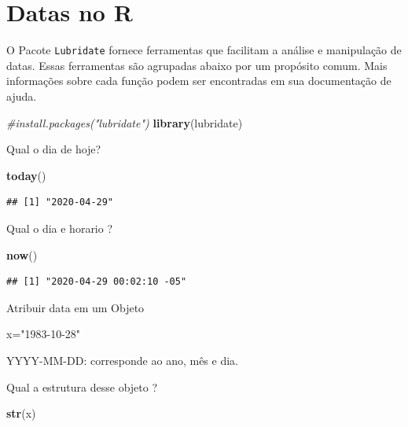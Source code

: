 \documentclass[
]{book}
\newenvironment{Shaded}{\begin{snugshade}}{\end{snugshade}}
\newcommand{\CommentTok}[1]{\textcolor[rgb]{0.56,0.35,0.01}{\textit{#1}}}
\newcommand{\KeywordTok}[1]{\textcolor[rgb]{0.13,0.29,0.53}{\textbf{#1}}}
\newcommand{\NormalTok}[1]{#1}
\newcommand{\StringTok}[1]{\textcolor[rgb]{0.31,0.60,0.02}{#1}}
\begin{document}
\hypertarget{datas-no-r}{%
\section{Datas no R}\label{datas-no-r}}

O Pacote \texttt{Lubridate} fornece ferramentas que facilitam a análise e manipulação de datas. Essas ferramentas são agrupadas abaixo por um propósito comum. Mais informações sobre cada função podem ser encontradas em sua documentação de ajuda.

\begin{Shaded}
\begin{Highlighting}[]
\CommentTok{#install.packages("lubridate")}
\KeywordTok{library}\NormalTok{(lubridate)}
\end{Highlighting}
\end{Shaded}

Qual o dia de hoje?

\begin{Shaded}
\begin{Highlighting}[]
\KeywordTok{today}\NormalTok{()}
\end{Highlighting}
\end{Shaded}

\begin{verbatim}
## [1] "2020-04-29"
\end{verbatim}

Qual o dia e horario ?

\begin{Shaded}
\begin{Highlighting}[]
\KeywordTok{now}\NormalTok{()}
\end{Highlighting}
\end{Shaded}

\begin{verbatim}
## [1] "2020-04-29 00:02:10 -05"
\end{verbatim}

Atribuir data em um Objeto

\begin{Shaded}
\begin{Highlighting}[]
\NormalTok{x=}\StringTok{"1983-10-28"}
\end{Highlighting}
\end{Shaded}

YYYY-MM-DD: corresponde ao ano, mês e dia.

Qual a estrutura desse objeto ?

\begin{Shaded}
\begin{Highlighting}[]
\KeywordTok{str}\NormalTok{(x)}
\end{Highlighting}
\end{Shaded}
\end{document}
